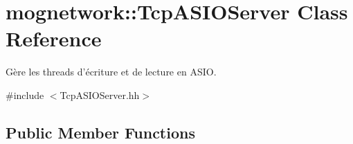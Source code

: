 \hypertarget{classmognetwork_1_1_tcp_a_s_i_o_server}{\section{mognetwork\-:\-:Tcp\-A\-S\-I\-O\-Server Class Reference}
\label{classmognetwork_1_1_tcp_a_s_i_o_server}
}


Gère les threads d'écriture et de lecture en A\-S\-I\-O.  




{\ttfamily \#include $<$Tcp\-A\-S\-I\-O\-Server.\-hh$>$}

\subsection*{Public Member Functions}
